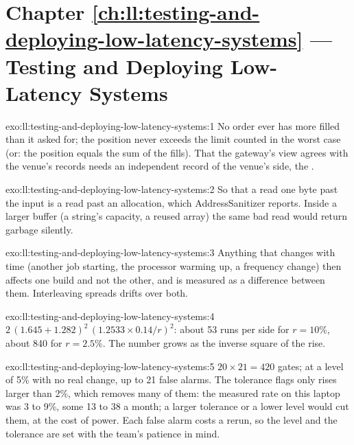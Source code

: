 \section*{Chapter \ref{ch:ll:testing-and-deploying-low-latency-systems} --- Testing and Deploying Low-Latency Systems}

\begin{solution}{exo:ll:testing-and-deploying-low-latency-systems:1}
No order ever has more filled than it asked for; the position never exceeds the limit counted in the worst case (or: the
position equals the sum of the fills). That the gateway's view agrees with the venue's records needs an independent record of
the venue's side, the .
\end{solution}

\begin{solution}{exo:ll:testing-and-deploying-low-latency-systems:2}
So that a read one byte past the input is a read past an allocation, which AddressSanitizer reports. Inside a larger buffer
(a string's capacity, a reused array) the same bad read would return garbage silently.
\end{solution}

\begin{solution}{exo:ll:testing-and-deploying-low-latency-systems:3}
Anything that changes with time (another job starting, the processor warming up, a frequency change) then affects one build and
not the other, and is measured as a difference between them. Interleaving spreads drifts over both.
\end{solution}

\begin{solution}{exo:ll:testing-and-deploying-low-latency-systems:4}
$2\,(1.645 + 1.282)^2\,(1.2533 \times 0.14 / r)^2$: about 53 runs per side for $r = 10\%$, about 840 for $r = 2.5\%$. The
number grows as the inverse square of the rise.
\end{solution}

\begin{solution}{exo:ll:testing-and-deploying-low-latency-systems:5}
$20 \times 21 = 420$ gates; at a level of 5\% with no real change, up to 21 false alarms. The tolerance flags only rises larger
than 2\%, which removes many of them: the measured rate on this laptop was 3 to 9\%, some 13 to 38 a month; a larger tolerance or
a lower level would cut them, at the cost of power. Each false alarm costs a rerun, so the level and the tolerance are set with the team's patience in mind.
\end{solution}

